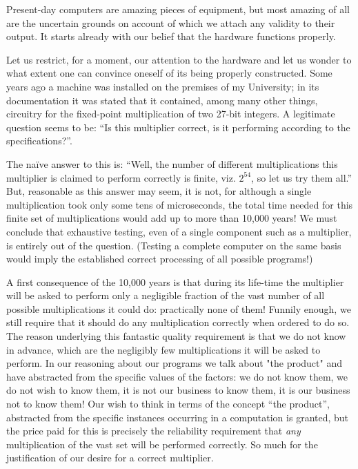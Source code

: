 Present-day computers are amazing pieces of equipment, but most amazing of all are the uncertain grounds on account of which we attach any validity to their output. It starts already with our belief that the hardware functions properly.

Let us restrict, for a moment, our attention to the hardware and let us wonder to what extent one can convince oneself of its being properly constructed. Some years ago a machine was installed on the premises of my University; in its documentation it was stated that it contained, among many other things, circuitry for the fixed-point multiplication of two 27-bit integers. A legitimate question seems to be: ``Is this multiplier correct, is it performing according to the specifications?''.

The naïve answer to this is: ``Well, the number of different multiplications this multiplier is claimed to perform correctly is finite, viz. $2^{54}$, so let us try them all.'' But, reasonable as this answer may seem, it is not, for although a single multiplication took only some tens of microseconds, the total time needed for this finite set of multiplications would add up to more than 10,000 years! We must conclude that exhaustive testing, even of a single component such as a multiplier, is entirely out of the question. (Testing a complete computer on the same basis would imply the established correct processing of all possible programs!)

A first consequence of the 10,000 years is that during its life-time the multiplier will be asked to perform only a negligible fraction of the vast number of all possible multiplications it could do: practically none of them! Funnily enough, we still require that it should do any multiplication correctly when ordered to do so. The reason underlying this fantastic quality requirement is that we do not know in advance, which are the negligibly few multiplications it will be asked to perform. In our reasoning about our programs we talk about "the product" and have abstracted from the specific values of the factors: we do not know them, we do not wish to know them, it is not our business to know them, it is our business not to know them! Our wish to think in terms of the concept ``the product'', abstracted from the specific instances occurring in a computation is granted, but the price paid for this is precisely the reliability requirement that \textit{any} multiplication of the vast set will be performed correctly. So much for the justification of our desire for a correct multiplier.


